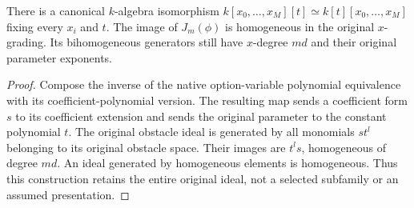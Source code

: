 \begin{lemma}
\label{lem:c0n-obstacle-parameter-swap}
\leanok
There is a canonical $k$-algebra isomorphism
$k[x_0,\ldots,x_M][t]\simeq k[t][x_0,\ldots,x_M]$ fixing every $x_i$ and $t$.
The image of $J_m(\phi)$ is homogeneous in the original $x$-grading. Its
bihomogeneous generators still have $x$-degree $md$ and their original
parameter exponents.
\end{lemma}
\begin{proof}
Compose the inverse of the native option-variable polynomial equivalence with
its coefficient-polynomial version. The resulting map sends a coefficient
form $s$ to its coefficient extension and sends the original parameter to the
constant polynomial $t$. The original obstacle ideal is generated by all
monomials $s t^l$ belonging to its original obstacle space. Their images are
$t^l s$, homogeneous of degree $md$. An ideal generated by homogeneous elements
is homogeneous. Thus this construction retains the entire original ideal,
not a selected subfamily or an assumed presentation.
\end{proof}

